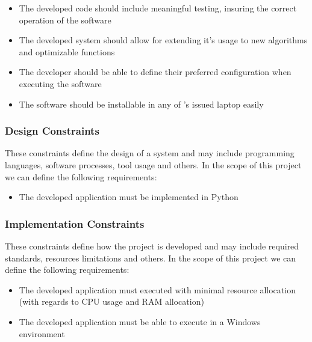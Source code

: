 \begin{itemize}
	\item The developed code should include meaningful testing, insuring the correct operation of the software
	\item The developed system should allow for extending it's usage to new algorithms and optimizable functions
	\item The developer should be able to define their preferred configuration when executing the software
	\item The software should be installable in any of \faro's issued laptop easily
\end{itemize}

\subsubsection{Design Constraints}


These constraints define the design of a system and may include programming languages, software processes, tool usage and others. In the scope of this project we can define the following requirements:

\begin{itemize}
	\item The developed application must be implemented in Python
\end{itemize}

\subsubsection{Implementation Constraints} 

These constraints define how the project is developed and may include required standards, resources limitations and others. In the scope of this project we can define the following requirements:

\begin{itemize}
	\item The developed application must executed with minimal resource allocation (with regards to CPU usage and RAM allocation)
	\item The developed application must be able to execute in a Windows environment
\end{itemize}


